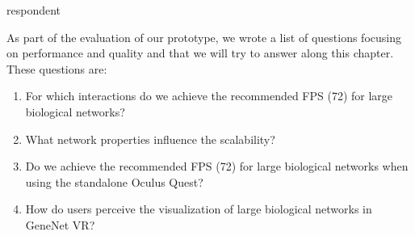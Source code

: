 respondent %



As part of the evaluation of our prototype, we wrote a list of questions focusing on performance and quality and that we will try to answer along this chapter. These questions are:
\begin{enumerate}
  \item For which interactions do we achieve the recommended FPS (72) for large biological networks?
  \item What network properties influence the scalability?
  \item Do we achieve the recommended FPS (72) for large biological networks when using the standalone Oculus Quest?
  \item How do users perceive the visualization of large biological networks in GeneNet VR?
\end{enumerate}

